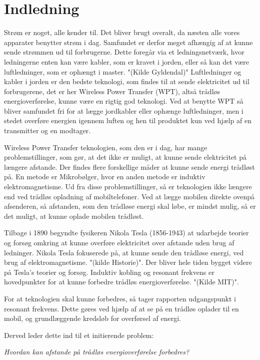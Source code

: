 \chapter{Indledning}
Strøm er noget, alle kender til. Det bliver brugt overalt, da næsten alle vores apparater benytter strøm i dag. Samfundet er derfor meget afhængig af at kunne sende strømmen ud til forbrugerne. Dette foregår via et ledningsnetværk, hvor ledningerne enten kan være kabler, som er kravet i jorden, eller så kan det være luftledninger, som er ophængt i master. "(Kilde Gyldendal)" Luftledninger og kabler i jorden er den bedste teknologi, som findes til at sende elektricitet ud til forbrugerene, det er her Wireless Power Transfer (WPT), altså trådløs energioverførelse, kunne være en rigtig god teknologi. Ved at benytte WPT så bliver samfundet fri for at lægge jordkabler eller ophænge luftledninger, men i stedet overføre energien igennem luften og hen til produktet kun ved hjælp af en transmitter og en modtager.

Wireless Power Transfer teknologien, som den er i dag, har mange problemstillinger, som gør, at det ikke er muligt, at kunne sende elektricitet på længere afstande. Der findes flere forskellige måder at kunne sende energi trådløst på. En metode er Mikrobølger, hvor en anden metode er induktiv elektromagnetisme. Ud fra disse problemstillinger, så er teknologien ikke længere end ved trådløs opladning af mobiltelefoner. Ved at lægge mobilen direkte ovenpå afsenderen, så afstanden, som den trådløse energi skal løbe, er mindst mulig, så er det muligt, at kunne oplade mobilen trådløst.

Tilbage i 1890 begyndte fysikeren Nikola Tesla (1856-1943) at udarbejde teorier og forsøg omkring at kunne overføre elektricitet over afstande uden brug af ledninger. Nikola Tesla fokuserede på, at kunne sende den trådløse energi, ved brug af elektromagnetisme. "(kilde Historie)". Der bliver hele tiden bygget videre på Tesla's teorier og forsøg. Induktiv kobling og resonant frekvens er hovedpunkter for at kunne forbedre trådløs energioverførelse. "(Kilde MIT)".

For at teknologien skal kunne forbedres, så tager rapporten udgangspunkt i resonant frekvens. Dette gøres ved hjælp af at se på en trådløs oplader til en mobil, og grundlæggende kredsløb for overførsel af energi.

Derved leder dette ind til et initierende problem:

\textit{Hvordan kan afstande på trådløs energioverførelse forbedres?}